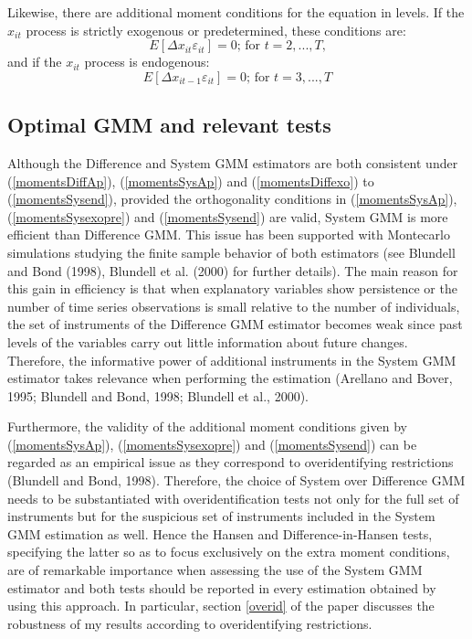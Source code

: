 Likewise, there are additional moment conditions for the equation in levels. If the $x_{it}$ process is strictly exogenous or predetermined, these conditions are:
\begin{equation}
\label{momentsSysexopre}
\tag{15'}
E\left[\Delta x_{it}\varepsilon_{it}\right]=0 \text{; for $t=2,...,T$,}
\end{equation}
and if the $x_{it}$ process is endogenous:
\begin{equation}
\label{momentsSysend}
\tag{16'}
E\left[\Delta x_{it-1}\varepsilon_{it}\right]=0 \text{; for $t=3,...,T$}
\end{equation}

\subsection*{Optimal GMM and relevant tests}

Although the Difference and System GMM estimators are both consistent under (\ref{momentsDiffAp}), (\ref{momentsSysAp}) and (\ref{momentsDiffexo}) to (\ref{momentsSysend}), provided the orthogonality conditions in (\ref{momentsSysAp}), (\ref{momentsSysexopre}) and (\ref{momentsSysend}) are valid,  System GMM is more efficient than Difference GMM. This issue has been supported with Montecarlo simulations studying the finite sample behavior of both estimators (see Blundell and Bond (1998), Blundell et al. (2000) for further details). The main reason for this gain in efficiency is that when explanatory variables show persistence or the number of time series observations is small relative to the number of individuals, the set of instruments of the Difference GMM estimator becomes weak since past levels of the variables carry out little information about future changes. Therefore, the informative power of additional instruments in the System GMM estimator takes relevance when performing the estimation (Arellano and Bover, 1995; Blundell and Bond, 1998; Blundell et al., 2000).

Furthermore, the validity of the additional moment conditions given by (\ref{momentsSysAp}), (\ref{momentsSysexopre}) and (\ref{momentsSysend}) can be regarded as an empirical issue as they correspond to overidentifying restrictions (Blundell and Bond, 1998). Therefore, the choice of System over Difference GMM needs to be substantiated with overidentification tests not only for the full set of instruments but for the suspicious set of instruments included in the System GMM estimation as well. Hence the Hansen and Difference-in-Hansen tests, specifying the latter so as to focus exclusively on the extra moment conditions, are of remarkable importance when assessing the use of the System GMM estimator and both tests should be reported in every estimation obtained by using this approach. In particular, section \ref{overid} of the paper discusses the robustness of my results according to overidentifying restrictions.

